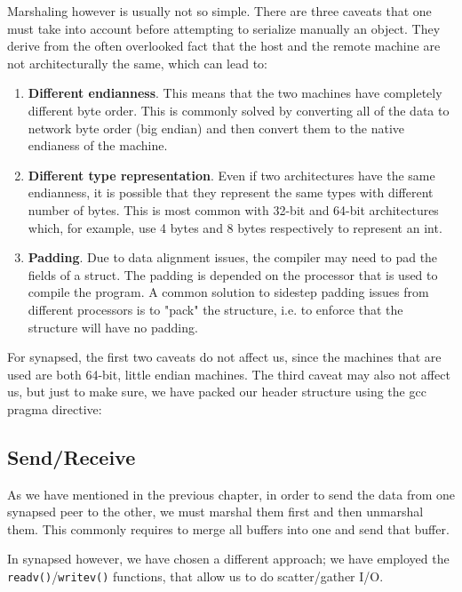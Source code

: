 Marshaling however is usually not so simple. There are three caveats that one 
must take into account before attempting to serialize manually an object. They 
derive from the often overlooked fact that the host and the remote machine are 
not architecturally the same, which can lead to:

\begin{enumerate}
	\item \textbf{Different endianness}. This means that the two machines have 
		completely different byte order. This is commonly solved by converting 
		all of the data to network byte order (big endian) and then convert 
		them to the native endianess of the machine.
	\item \textbf{Different type representation}. Even if two architectures 
		have the same endianness, it is possible that they represent the same 
		types with different number of bytes. This is most common with 32-bit 
		and 64-bit architectures which, for example, use 4 bytes and 8 bytes 
		respectively to represent an int.
	\item \textbf{Padding}. Due to data alignment issues, the compiler may 
		need to pad the fields of a struct. The padding is depended on 
		the processor that is used to compile the program. A common 
		solution to sidestep padding issues from different processors 
		is to "pack" the structure, i.e.  to enforce that the structure 
		will have no padding.
\end{enumerate}

For synapsed, the first two caveats do not affect us, since the machines that 
are used are both 64-bit, little endian machines. The third caveat may also not 
affect us, but just to make sure, we have packed our header structure using the 
gcc pragma directive:


\subsection{Send/Receive}

As we have mentioned in the previous chapter, in order to send the data from 
one synapsed peer to the other, we must marshal them first and then unmarshal 
them. This commonly requires to merge all buffers into one and send that 
buffer.  

In synapsed however, we have chosen a different approach; we have employed the 
\texttt{readv()}/\texttt{writev()} functions, that allow us to do 
scatter/gather I/O.

